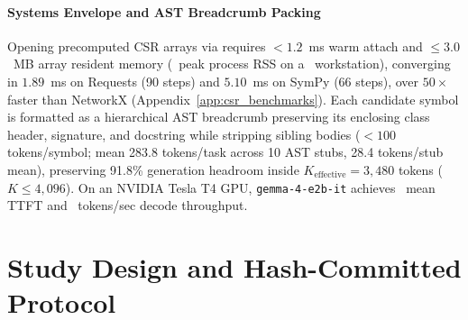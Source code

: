 \documentclass[10pt]{article}
\begin{document}
\paragraph{Systems Envelope and AST Breadcrumb Packing}
Opening precomputed CSR arrays via  requires $<1.2$~ms warm attach and $\le 3.0$~MB array resident memory (\EnginePeakRSSMB\ peak process RSS on a \HostRAMGiB\ workstation), converging in $1.89$~ms on Requests (90 steps) and $5.10$~ms on SymPy (66 steps), over $50\times$ faster than NetworkX (Appendix~\ref{app:csr_benchmarks}). Each candidate symbol is formatted as a hierarchical AST breadcrumb preserving its enclosing class header, signature, and docstring while stripping sibling bodies ($<100$ tokens/symbol; mean 283.8 tokens/task across 10 AST stubs, 28.4 tokens/stub mean), preserving 91.8\% generation headroom inside $K_{\text{effective}} = 3,480$ tokens ($K \le 4,096$). On an NVIDIA Tesla T4 GPU, \texttt{gemma-4-e2b-it} achieves \GemmaMeanTTFTMs\ mean TTFT and \GemmaDecodeTokensSec\ tokens/sec decode throughput.
\section{Study Design and Hash-Committed Protocol}
\label{sec:protocol}
\end{document}

